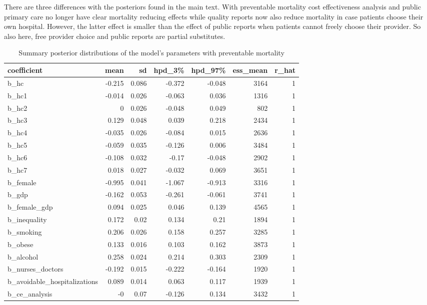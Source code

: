 \documentclass{article}
\begin{document}
There are three differences with the posteriors found in the main text. With preventable mortality cost effectiveness analysis and public primary care no longer have clear mortality reducing effects while quality reports now also reduce mortality in case patients choose their own hospital. However, the latter effect is smaller than the effect of public reports when patients cannot freely choose their provider. So also here, free provider choice and public reports are partial substitutes.

\begin{table}[htbp]
\caption{\label{tab:org2e65b0a}Summary posterior distributions of the model's parameters with preventable mortality}
\centering
\begin{tabular}{lrrrrrr}
coefficient & mean & sd & hpd\_3\% & hpd\_97\% & ess\_mean & r\_hat\\
\hline
b\_hc & -0.215 & 0.086 & -0.372 & -0.048 & 3164 & 1\\
b\_hc1 & -0.014 & 0.026 & -0.063 & 0.036 & 1316 & 1\\
b\_hc2 & 0 & 0.026 & -0.048 & 0.049 & 802 & 1\\
b\_hc3 & 0.129 & 0.048 & 0.039 & 0.218 & 2434 & 1\\
b\_hc4 & -0.035 & 0.026 & -0.084 & 0.015 & 2636 & 1\\
b\_hc5 & -0.059 & 0.035 & -0.126 & 0.006 & 3484 & 1\\
b\_hc6 & -0.108 & 0.032 & -0.17 & -0.048 & 2902 & 1\\
b\_hc7 & 0.018 & 0.027 & -0.032 & 0.069 & 3651 & 1\\
b\_female & -0.995 & 0.041 & -1.067 & -0.913 & 3316 & 1\\
b\_gdp & -0.162 & 0.053 & -0.261 & -0.061 & 3741 & 1\\
b\_female\_gdp & 0.094 & 0.025 & 0.046 & 0.139 & 4565 & 1\\
b\_inequality & 0.172 & 0.02 & 0.134 & 0.21 & 1894 & 1\\
b\_smoking & 0.206 & 0.026 & 0.158 & 0.257 & 3285 & 1\\
b\_obese & 0.133 & 0.016 & 0.103 & 0.162 & 3873 & 1\\
b\_alcohol & 0.258 & 0.024 & 0.214 & 0.303 & 2309 & 1\\
b\_nurses\_doctors & -0.192 & 0.015 & -0.222 & -0.164 & 1920 & 1\\
b\_avoidable\_hospitalizations & 0.089 & 0.014 & 0.063 & 0.117 & 1939 & 1\\
b\_ce\_analysis & -0 & 0.07 & -0.126 & 0.134 & 3432 & 1\\

\end{tabular}
\end{table}
\end{document}
